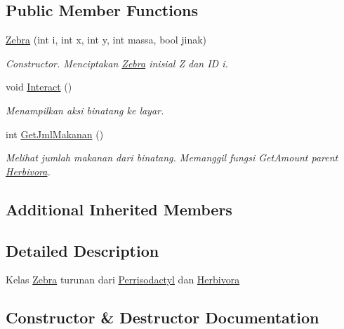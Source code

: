 \subsection*{Public Member Functions}
\begin{DoxyCompactItemize}
\item 
\hyperlink{classZebra_a92d2891c5e617e0d19fa54a95dc89f15}{Zebra} (int i, int x, int y, int massa, bool jinak)
\begin{DoxyCompactList}\small\item\em Constructor. Menciptakan \hyperlink{classZebra}{Zebra} inisial \textquotesingle{}Z\textquotesingle{} dan ID i. \end{DoxyCompactList}\item 
void \hyperlink{classZebra_af5bbdf2d9898cda8036a3ff2d43f162a}{Interact} ()\hypertarget{classZebra_af5bbdf2d9898cda8036a3ff2d43f162a}{}\label{classZebra_af5bbdf2d9898cda8036a3ff2d43f162a}

\begin{DoxyCompactList}\small\item\em Menampilkan aksi binatang ke layar. \end{DoxyCompactList}\item 
int \hyperlink{classZebra_a1ad885f1ff84bfea442a330fea7c6eaa}{Get\+Jml\+Makanan} ()
\begin{DoxyCompactList}\small\item\em Melihat jumlah makanan dari binatang. Memanggil fungsi Get\+Amount parent \hyperlink{classHerbivora}{Herbivora}. \end{DoxyCompactList}\end{DoxyCompactItemize}
\subsection*{Additional Inherited Members}


\subsection{Detailed Description}
Kelas \hyperlink{classZebra}{Zebra} turunan dari \hyperlink{classPerrisodactyl}{Perrisodactyl} dan \hyperlink{classHerbivora}{Herbivora} 

\subsection{Constructor \& Destructor Documentation}
